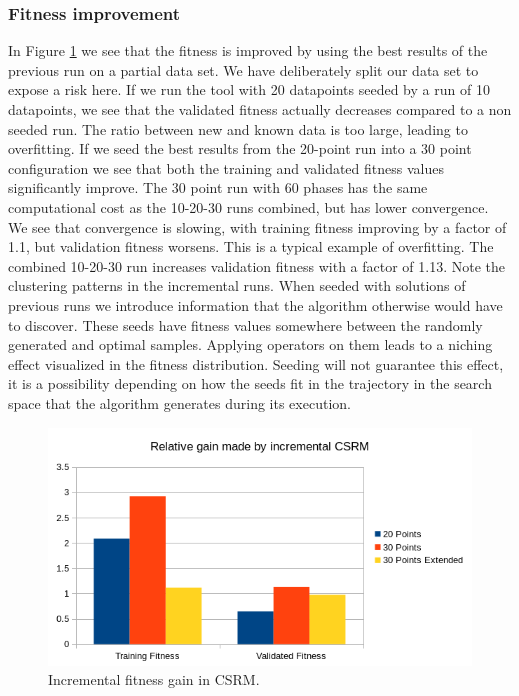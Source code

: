 \subsubsection{Fitness improvement}
In Figure \ref{fig:incrementalgain} we see that the fitness is improved by using the best results of the previous run on a partial data set. We have deliberately split our data set to expose a risk here. If we run the tool with 20 datapoints seeded by a run of 10 datapoints, we see that the validated fitness actually decreases compared to a non seeded run. The ratio between new and known data is too large, leading to overfitting. If we seed the best results from the 20-point run into a 30 point configuration we see that both the training and validated fitness values significantly improve. 
The 30 point run with 60 phases has the same computational cost as the 10-20-30 runs combined, but has lower convergence. We see that convergence is slowing, with training fitness improving by a factor of 1.1, but validation fitness worsens. This is a typical example of overfitting. The combined 10-20-30 run increases validation fitness with a factor of 1.13. Note the clustering patterns in the incremental runs. When seeded with solutions of previous runs we introduce information that the algorithm otherwise would have to discover. These seeds have fitness values somewhere between the randomly generated and optimal samples. Applying operators on them leads to a niching effect visualized in the fitness distribution. Seeding will not guarantee this effect, it is a possibility depending on how the seeds fit in the trajectory in the search space that the algorithm generates during its execution.
\begin{figure}
    \centering
    \includegraphics[width=\textwidth,height=\textheight,keepaspectratio]{figures/incrementalgain.png}
    \caption{Incremental fitness gain in CSRM.}
    \label{fig:incrementalgain}
\end{figure}
